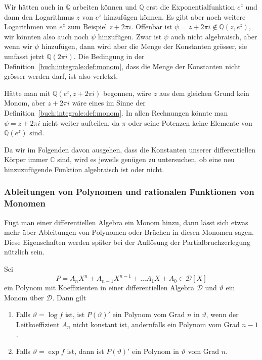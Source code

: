 \begin{beispiel}
Wir hätten auch in $\mathbb{Q}$ arbeiten können und $\mathbb{Q}$
erst die Exponentialfunktion $e^z$ und dann den Logarithmus $z$ von $e^z$
hinzufügen können.
Es gibt aber noch weitere Logarithmen von $e^z$ zum Beispiel $z+2\pi i$.
Offenbar ist $\psi=z+2\pi i\not\in \mathbb{Q}(z,e^z)$, wir könnten also
auch noch $\psi$ hinzufügen.
Zwar ist $\psi$ auch nicht algebraisch, aber wenn wir $\psi$ hinzufügen,
dann wird aber die Menge der Konstanten grösser, sie umfasst jetzt
$\mathbb{Q}(2\pi i)$.
Die Bedingung in der Definition~\ref{buch:integrale:def:monom},
dass die Menge der Konstanten nicht grösser werden darf, ist also
verletzt.

Hätte man mit $\mathbb{Q}(e^z, z+2\pi i)$ begonnen, wäre $z$ aus
dem gleichen Grund kein Monom, aber $z+2\pi i$ wäre eines im Sinne
der Definition~\ref{buch:integrale:def:monom}.
In allen Rechnungen könnte man $\psi=z+2\pi i$ nicht weiter aufteilen,
da $\pi$ oder seine Potenzen keine Elemente von $\mathbb{Q}(e^z)$ sind.
\end{beispiel}

Da wir im Folgenden davon ausgehen, dass die Konstanten unserer
differentiellen Körper immer $\mathbb{C}$ sind, wird es jeweils
genügen zu untersuchen, ob eine neu hinzuzufügende Funktion algebraisch
ist oder nicht.

\subsubsection{Ableitungen von Polynomen und rationalen Funktionen von Monomen}
Fügt man einer differentiellen Algebra ein Monom hinzu, dann lässt
sich etwas mehr über Ableitungen von Polynomen oder Brüchen in diesen
Monomen sagen.
Diese Eigenschaften werden später bei der Auflösung der Partialbruchzerlegung
nützlich sein.

\begin{satz}
\label{buch:integrale:satz:polynom-ableitung-grad}
Sei
\[
P
=
A_nX^n + A_{n-1}X^{n-1} + \dots A_1X+A_0
\in\mathscr{D}[X]
\]
ein Polynom mit Koeffizienten in einer differentiellen Algebra $\mathscr{D}$
und $\vartheta$ ein Monom über $\mathscr{D}$.
Dann gilt
\begin{enumerate}
\item
\label{buch:integrale:satz:polynom-ableitung-grad-log}
Falls $\vartheta=\log f$ ist, ist $P(\vartheta)'$ ein
Polynom vom Grad $n$ in $\vartheta$, wenn der Leitkoeffizient $A_n$
nicht konstant ist, andernfalls ein Polynom vom Grad $n-1$.
\item
\label{buch:integrale:satz:polynom-ableitung-grad-exp}
Falls $\vartheta = \exp f$ ist, dann ist $P(\vartheta)'$ ein Polynom
in $\vartheta$ vom Grad $n$.
\end{enumerate}
\end{satz}

